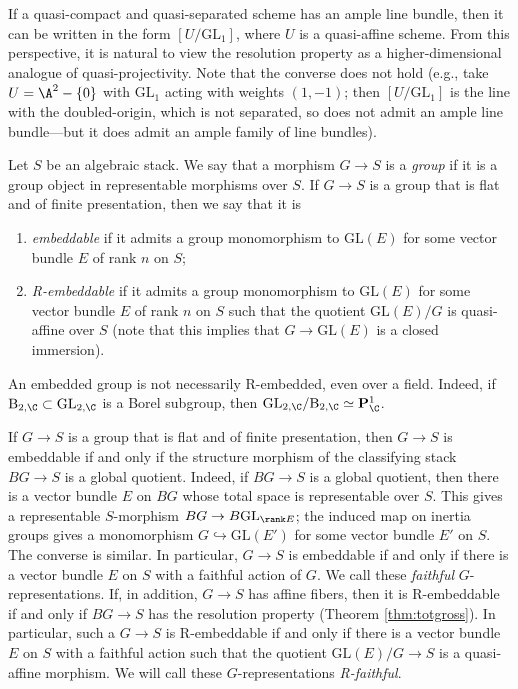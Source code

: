 \documentclass[reqno,a4paper]{amsart}
\numberwithin{Theorem}{section}
\renewcommand{\GL}{\mathrm{GL}}
\renewcommand{\B}{\mathrm{B}}
\theoremstyle{plain}
\theoremstyle{remark}
\newcommand{\classB}{B}
\begin{document}
If a quasi-compact and quasi-separated scheme has an ample line
bundle, then it can be written in the form $[U/\GL_1]$, where $U$ is a
quasi-affine scheme. From this perspective, it is natural to view the
resolution property as a higher-dimensional analogue of
quasi-projectivity. Note that the converse does not hold (e.g., take
$U=\A^2-\{0\}$ with $\GL_1$ acting with weights $(1,-1)$; then
$[U/\GL_1]$ is the line with the doubled-origin, which is not
separated, so does not admit an ample line bundle---but it does admit an ample family of line bundles).

\begin{definition}\label{D:embedding-groups}
  Let $S$ be an algebraic stack. We say that a morphism $G \to S$ is a
  \emph{group} if it is a group object in representable morphisms over $S$.  If $G \to S$ is a group that is flat and of finite presentation, then we say that it is
  \begin{enumerate}
  \item \emph{embeddable} if it admits a group monomorphism to $\GL(E)$ for
    some vector bundle $E$ of rank $n$ on $S$; 
      \item \emph{R-embeddable}  if it admits a group monomorphism to $\GL(E)$
    for some vector bundle $E$ of rank $n$ on $S$ such that the quotient
    $\GL(E)/G$ is quasi-affine over $S$ (note that this implies that
    $G \to \GL(E)$ is a closed immersion).
  \end{enumerate}
\end{definition}
\begin{Example} \label{ex:faithful} An embedded group is
  not necessarily R-embedded, even over a field. Indeed, if 
  $\B_{2,\C} \subset \GL_{2,\C}$ is a Borel subgroup, then
  $\GL_{2,\C}/\B_{2,\C} \simeq \mathbf{P}^1_\C$. 
\end{Example}
\begin{remark}
  If $G \to S$ is a group that is flat and of finite presentation, then $G \to S$ is embeddable if and only if the structure morphism of
  the classifying stack $\classB G \to S$ is a global
  quotient. Indeed, if $\classB G \to S$ is a global quotient, then
  there is a vector bundle $E$ on $\classB G$ whose total space is
  representable over $S$. This gives a representable $S$-morphism
  $\classB G \to \classB \GL_{\rank E}$; the induced map on inertia
  groups gives a monomorphism $G \hookrightarrow \GL(E')$ for some
  vector bundle $E'$ on $S$. The converse is similar. In particular,
  $G \to S$ is embeddable if and only if there is a vector bundle $E$
  on $S$ with a faithful action of $G$.  We call these \emph{faithful}
  $G$-representations. If, in addition, $G \to S$ has affine fibers, then it is R-embeddable if and only if
  $\classB G \to S$ has the resolution property (Theorem \ref{thm:totgross}).  In particular,
 such a $G \to S$ is R-embeddable if and only if there is a vector bundle
  $E$ on $S$ with a faithful action such that the quotient
  $\GL(E)/G \to S$ is a quasi-affine morphism. We will call these
  $G$-representations \emph{R-faithful}.
\end{remark}
\end{document}

